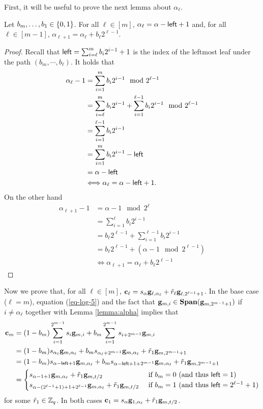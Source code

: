 First, it will be useful to prove the next lemma about $\alpha_\ell$.
\begin{lemma} Let $b_m,\ldots,b_1\in\{0,1\}$. For all $\ell\in[m]$, $\alpha_\ell = \alpha-{\mathsf{left}}+1$ and, for all $\ell\in[m-1]$, $\alpha_{\ell+1}=\alpha_{\ell}+b_\ell2^{\ell-1}$.
\label{lemma:alpha}
\end{lemma}
\begin{proof}
Recall that ${\mathsf{left}}=\sum_{i=\ell}^m b_i2^{i-1}+1$ is the index of the leftmost leaf under the path $(b_m,\cdots, b_\ell)$. It holds that
\begin{align*}
\alpha_\ell-1 &= \sum_{i=1}^m b_i2^{i-1} \mod 2^{\ell-1}\\
              &= \sum_{i=\ell}^m b_i 2^{i-1} + \sum_{i=1}^{\ell-1}b_i2^{i-1} \mod 2^{\ell-1}\\
              &= \sum_{i=1}^{\ell-1}b_i2^{i-1}\\
              &= \sum_{i=1}^m b_i2^{i-1} - {\mathsf{left}}\\
              &= \alpha-{\mathsf{left}}\\
&\Longleftrightarrow \alpha_\ell=\alpha-{\mathsf{left}}+1.
\end{align*}
On the other hand
\begin{align*}
\alpha_{\ell+1}-1 &= \alpha-1 \mod 2^\ell\\
&= \sum_{i=1}^{\ell} b_i2^{i-1}\\
&= b_\ell2^{\ell-1}+\sum_{i=1}^{\ell-1}b_i 2^{i-1}\\
&= b_\ell2^{\ell-1} + (\alpha-1 \mod 2^{\ell-1})\\
&\Longleftrightarrow \alpha_{\ell+1}=\alpha_\ell+b_\ell2^{\ell-1}
\end{align*}
\end{proof}

Now we prove that, for all $\ell\in[m]$, \(\mathbf{c}_\ell= s_\alpha\mathbf{g}_{\ell,\alpha_\ell}+\tilde{r}_{\ell}\mathbf{g}_{\ell,2^{\ell-1}+1}\).
In the base case ($\ell=m$), equation (\ref{eq-log-5}) and the fact that \(\mathbf{g}_{m,i}\in\mathbf{Span}(\mathbf{g}_{m,2^{m-1}+1})\) if \(i\neq \alpha_\ell\) together with Lemma \ref{lemma:alpha} implies that 
\begin{align*}
\mathbf{c}_m &= (1-b_m)\sum_{i=1}^{2^{m-1}}s_i \mathbf{g}_{m,i}+b_m\sum_{i=1}^{2^{m-1}}s_{i+2^{m-1}}\mathbf{g}_{m,i}\\
&= (1-b_m)s_{\alpha_\ell}\mathbf{g}_{m,\alpha_\ell} +b_ms_{\alpha_\ell+2^{m-1}}\mathbf{g}_{m,\alpha_\ell}+\tilde{r}_1\mathbf{g}_{m,2^{m-1}+1}\\
&= (1-b_m)s_{\alpha-{\mathsf{left}}+1}\mathbf{g}_{m,\alpha_\ell} +b_ms_{\alpha-{\mathsf{left}}+1+2^{m-1}}\mathbf{g}_{m,\alpha_\ell}+\tilde{r}_1\mathbf{g}_{m,2^{m-1}+1}\\
&=\begin{cases}
    s_{\alpha-1+1}\mathbf{g}_{m,\alpha_\ell}+\tilde{r}_1\mathbf{g}_{m,t/2} & \text{ if } b_m=0 \ (\text{and thus }{\mathsf{left}}=1) \\
    s_{\alpha-(2^{\ell-1}+1)+1+2^{\ell-1}}\mathbf{g}_{m,\alpha_\ell}+\tilde{r}_1\mathbf{g}_{m,t/2} & \text{ if } b_m=1 \ (\text{and thus }{\mathsf{left}}=2^{\ell-1}+1) 
\end{cases}
\end{align*}
for some \(\tilde{r}_1\in\mathbb{Z}_q\). In both cases $\mathbf{c}_1=s_\alpha\mathbf{g}_{1,\alpha_\ell}+\tilde{r}_1\mathbf{g}_{m,t/2}$.

